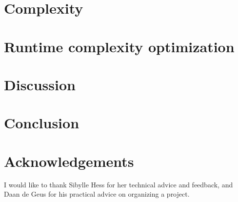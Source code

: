 \documentclass{scrartcl}
\begin{document}
    \section{Complexity}
    
    
    \section{Runtime complexity optimization}
    

    \section{Discussion}
    
    
    \section{Conclusion}
    
    
    \section{Acknowledgements}
    I would like to thank Sibylle Hess for her technical advice and feedback,
    and Daan de Geus for his practical advice on organizing a project.
    
    
    \printbibliography[
    heading=bibintoc,
    title={References}
    ]
    
    \appendix
    
    
\end{document}
